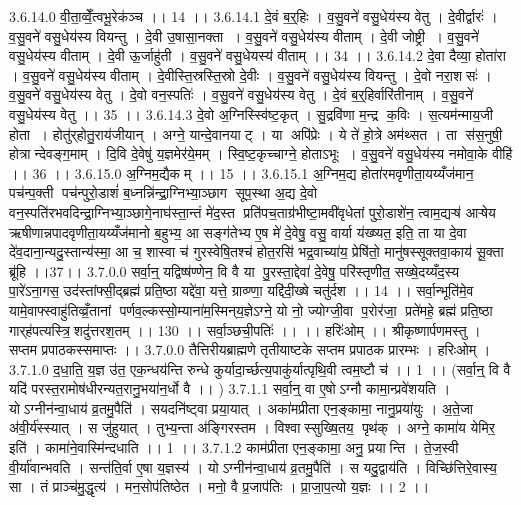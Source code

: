 3.6.14.0
वी॒ता॒व्वेँ॒त्वभू॒रेक॑ञ्च ।। 14 ।।
3.6.14.1
दे॒वं ब॒र्॒हिः । व॒सु॒वने॑ वसु॒धेय॑स्य वेतु । दे॒वीर्द्वारः॑ । व॒सु॒वने॑ वसु॒धेय॑स्य वियन्तु । दे॒वी उ॒षासा॒नक्ता । व॒सु॒वने॑ वसु॒धेय॑स्य वीताम् । दे॒वी जोष्ट्री । व॒सु॒वने॑ वसु॒धेय॑स्य वीताम् । दे॒वी ऊ॒र्जाहु॑ती । व॒सु॒वने॑ वसु॒धेयस्य॑ वीताम् ।। 34 ।।
3.6.14.2
दे॒वा दैव्या॒ होता॑रा । व॒सु॒वने॑ वसु॒धेय॑स्य वीताम् । दे॒वीस्ति॒स्रस्ति॒स्रो दे॒वीः । व॒सु॒वने॑ वसु॒धेय॑स्य वियन्तु । दे॒वो नरा॒शसः॑ । व॒सु॒वने॑ वसु॒धेय॑स्य वेतु । दे॒वो वन॒स्पतिः॑ । व॒सु॒वने॑ वसु॒धेय॑स्य वेतु । दे॒वं ब॒र्॒हिर्वारि॑तीनाम् । व॒सु॒वने॑ वसु॒धेय॑स्य वेतु ।। 35 ।।
3.6.14.3
दे॒वो अ॒ग्निस्स्वि॑ष्ट॒कृत् । सु॒द्रवि॑णा म॒न्द्र क॒विः । स॒त्यम॑न्माय॒जी होता । होतु॑र्‌होतु॒राय॑जीयान् । अग्ने॒ यान्दे॒वानयाट् । या अपि॑प्रेः । ये ते॑ हो॒त्रे अम॑थ्सत । ता स॑स॒नुषी॒॒ होत्रान्देवङ्ग॒माम् । दि॒वि दे॒वेषु॑ य॒ज्ञमेर॑ये॒मम् । स्वि॒ष्ट॒कृच्चाग्ने॒ होताऽभूः । व॒सु॒वने॑ वसु॒धेय॑स्य नमोवा॒के वीहि॑ ।। 36 ।।
3.6.15.0
अ॒ग्निम॒द्यैकम् ।। 15 ।।
3.6.15.1
अ॒ग्निम॒द्य होता॑रमवृणीता॒यय्यँज॑मान॒ पच॑न्प॒क्ती पच॑न्पुरो॒डाशं॑ ब॒ध्नन्नि॑न्द्रा॒ग्निभ्या॒ञ्छाग॑ सूप॒स्था अ॒द्य दे॒वो वन॒स्पति॑रभवदिन्द्रा॒ग्निभ्या॒ञ्छागे॒नाघ॑स्ता॒न्तं मे॑द॒स्त प्रति॑पच॒ताग्र॑भीष्टा॒मवी॑वृधेतां पुरो॒डाशे॑न॒ त्वाम॒द्यऱ्ष॑ आऱ्षेय ऋषीणान्नपादवृणीता॒यय्यँज॑मानो ब॒हुभ्य॒ आ सङ्ग॑तेभ्य ए॒ष मे॑ दे॒वेषु॒ वसु॒ वार्या य॑ख्ष्यत॒ इति॒ ता या दे॒वा दे॑व॒दाना॒न्यदु॒स्तान्य॑स्मा॒ आ च॒ शास्वा च॑ गुरस्वेषि॒तश्च॑ होत॒रसि॑ भद्र॒वाच्या॑य॒ प्रेषि॑तो॒ मानु॑षस्सूक्तवा॒काय॑ सू॒क्ता ब्रू॑हि ।।37।।
3.7.0.0
सर्वा॒न्॒ यद्विष्ष॑ण्णेन॒ वि वै या पु॒रस्ता॒द्देवा॑ दे॒वेषु॒ परि॑स्तृणीत॒ सख्षे॒दय्यँद॒स्य पा॒रे॑ऽना॒गस॒ उद॑स्तांफ्सी॒द्ब्रह्म॑ प्रति॒ष्ठा यद्दे॑वा॒ यत्ते॒ ग्राव्ण्णा॒ यद्दि॑दी॒ख्षे चतु॑र्दश ।। 14 ।। सर्वा॒न्भूति॑मे॒व यामे॒वाफ्स्वाहु॑तिव्व्रँ॒तानां पर्णव॒ल्कस्सो॒म्याना॑म॒स्मिन्‌य॒ज्ञेऽग्ने॒ यो नो॒ ज्योग्जी॒वा प॒रोर॑जा॒ प्रते॑महे॒ ब्रह्म॑ प्रति॒ष्ठा गार्‌ह॑पत्यस्त्रि॒॒शदु॑त्तरश॒तम् ।। 130 ।। सर्वा॒ञ्छची॒पतिः॑ ।। ।। हरिः॑ओम् ।। श्रीकृष्णार्पणमस्तु । सप्तम प्रपाठकस्समाप्तः ।।
3.7.0.0
तैत्तिरीयब्राह्मणे तृतीयाष्टके सप्तम प्रपाठक प्रारम्भः । हरिःओम् ।
3.7.1.0
द॒धा॒ति॒ य॒ज्ञ उ॑त॒ एक॒न्धय॑न्ति रुन्धे कुर्यादा॒र्च्छत्य॒पाकु॑र्यात्पृथि॒वी त्वम॒ष्टौ च॑ ।। 1 ।। (सर्वा॒न्॒ वि वै यदि॑ परस्त॒रामोष॑धीरन्यत॒रानु॒भया॑न॒र्धो वै ।। )
3.7.1.1
सर्वा॒न्॒ वा ए॒षोऽग्नौ कामा॒न्प्रवे॑शयति । योऽग्नीन॑न्वा॒धाय॑ व्र॒तमु॒पैति॑ । सयदनि॑ष्ट्वा प्रया॒यात् । अका॑मप्रीता एन॒ङ्कामा॒ नानु॒प्रया॑युः । अ॒ते॒जा अ॑वी॒र्य॑स्स्यात् । स जु॑हुयात् । तुभ्य॒न्ता अ॑ङ्गिरस्तम । विश्वास्सुख्षि॒तय॒ पृथ॑क् । अग्ने॒ कामा॑य येमिर॒ इति॑ । कामा॑ने॒वास्मि॑न्दधाति ।। 1 ।।
3.7.1.2
काम॑प्रीता एन॒ङ्कामा॒ अनु॒ प्रयान्ति । ते॒ज॒स्वी वी॒र्या॑वान्भवति । सन्त॑ति॒र्वा ए॒षा य॒ज्ञस्य॑ । योऽग्नीन॑न्वा॒धाय॑ व्र॒तमु॒पैति॑ । स यदु॒द्वाय॑ति । विच्छि॑त्तिरे॒वास्य॒ सा । तं प्राञ्च॑मु॒द्धृत्य॑ । मन॒सोप॑तिष्ठेत । मनो॒ वै प्र॒जाप॑तिः । प्रा॒जा॒प॒त्यो य॒ज्ञः ।। 2 ।।
